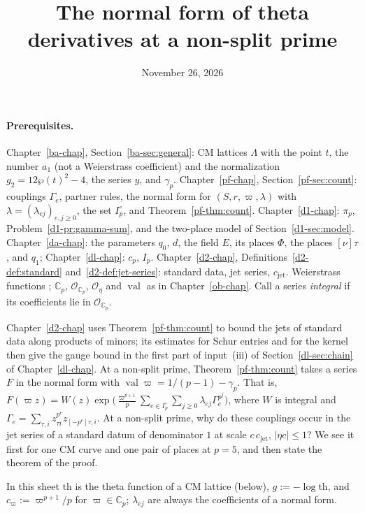 \documentclass[reqno]{amsart}
\title{The normal form of theta derivatives at a non-split prime}
\author{}
\date{November 26, 2026}
\newcounter{chap}
\theoremstyle{plain}
\theoremstyle{definition}
\theoremstyle{remark}
\newcommand{\C}{\mathbb{C}}
\newcommand{\Oc}{\mathcal{O}}
\newcommand{\Op}{\mathcal{O}_{\C_p}}
\newcommand{\val}{\operatorname{val}}
\newcommand{\cv}{c_\varpi}
\newcommand{\tth}{\mathrm{th}}
\newcommand{\cjet}{c_{\mathrm{jet}}}
\begin{document}
\maketitle
{}\label{chap}

\paragraph{Prerequisites.}
Chapter~\ref{ba-chap}, Section~\ref{ba-sec:general}: CM lattices \(\Lambda\) with the point \(t\), the number \(a_1\) (not a Weierstrass coefficient) and the normalization \(g_2 = 12\wp(t)^2 - 4\), the series \(y\), and \(\gamma_p\).  Chapter~\ref{pf-chap}, Section~\ref{pf-sec:count}: couplings \(\Gamma_e\), partner rules, the normal form for \((S, r, \varpi, \lambda)\) with \(\lambda = (\lambda_{ej})_{e,j \ge 0}\), the set \(I_p^\circ\), and Theorem~\ref{pf-thm:count}.  Chapter~\ref{d1-chap}: \(\pi_p\), Problem~\ref{d1-pr:gamma-sum}, and the two-place model of Section~\ref{d1-sec:model}.  Chapter~\ref{da-chap}: the parameters \(q_0\), \(d\), the field \(E\), its places \(\Phi\), the places \([\nu]\tau\), and \(q_1\); Chapter~\ref{dl-chap}: \(c_p\), \(I_p\).  Chapter~\ref{d2-chap}, Definitions~\ref{d2-def:standard} and~\ref{d2-def:jet-series}: standard data, jet series, \(\cjet\).  Weierstrass functions \cite[Ch.~VI]{AEC}; \(\C_p\), \(\Op\), \(\Oc_\eta\) and \(\val\) as in Chapter~\ref{ob-chap}.  Call a series \emph{integral} if its coefficients lie in \(\Op\).

\medskip
Chapter~\ref{d2-chap} uses Theorem~\ref{pf-thm:count} to bound the jets of standard data along products of minors; its estimates for Schur entries and for the kernel then give the gauge bound in the first part of input~(iii) of Section~\ref{dl-sec:chain} of Chapter~\ref{dl-chap}.  At a non-split prime, Theorem~\ref{pf-thm:count} takes a series \(F\) in the normal form with \(\val\varpi = 1/(p-1)-\gamma_p\).  That is, \(F(\varpi z) = W(z)\exp\bigl(\frac{\varpi^{p+1}}{p}\sum_{e \in I_p^\circ}\sum_{j \ge 0}\lambda_{ej}\Gamma_e^{p^j}\bigr)\), where \(W\) is integral and \(\Gamma_e = \sum_{\tau,i} z_{\tau i}^{p^e}z_{[-p^e]\tau,i}\).  At a non-split prime, why do these couplings occur in the jet series of a standard datum of denominator \(1\) at scale \(c\,\cjet\), \(\lvert\eta c\rvert \le 1\)?  We see it first for one CM curve and one pair of places at \(p = 5\), and then state the theorem of the proof.

In this sheet \(\tth\) is the theta function of a CM lattice (below), \(g := -\log \tth\), and \(\cv := \varpi^{p+1}/p\) for \(\varpi \in \C_p\); \(\lambda_{ej}\) are always the coefficients of a normal form.
\end{document}
